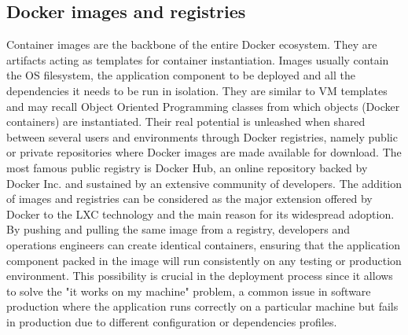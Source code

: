 \subsection{Docker images and registries}
Container images are the backbone of the entire Docker ecosystem. They are artifacts acting as templates for container instantiation. Images usually contain the OS filesystem, the application component to be deployed and all the dependencies it needs to be run in isolation. 
They are similar to VM templates and may recall Object Oriented Programming classes from which objects (Docker containers) are instantiated.
Their real potential is unleashed when shared between several users and environments through Docker registries, namely public or private repositories where Docker images are made available for download.
The most famous public registry is Docker Hub, an online repository backed by Docker Inc. and sustained by an extensive community of developers. \newline
The addition of images and registries can be considered as the major extension offered by Docker to the LXC technology and the main reason for its widespread adoption.
By pushing and pulling the same image from a registry, developers and operations engineers can create identical containers, ensuring that the application component packed in the image will run consistently on any testing or production environment.
This possibility is crucial in the deployment process since it allows to solve the "it works on my machine" problem, a common issue in software production where the application runs correctly on a particular machine but fails in production due to different configuration or dependencies profiles. 

